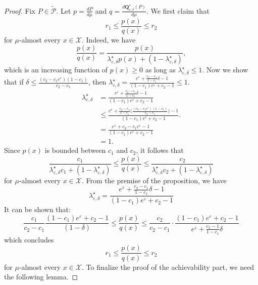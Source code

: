\documentclass[accepted]{article}
\theoremstyle{plain} %
\theoremstyle{definition}
\theoremstyle{remark}
\newcommand{\eps}{\varepsilon}
\newcommand{\bQ}{\mathbf{Q}}
\begin{document}
\begin{proof}
    Fix \( P \in \tilde{\mathcal{P}} \). Let \( p = \frac{dP}{d\mu} \) and \( q = \frac{d\bQ^\star_{\eps,\delta}(P)}{d\mu} \). We first claim that
\[
r_1 \leq \frac{p(x)}{q(x)} \leq r_2
\]
for \(\mu\)-almost every \( x \in \mathcal{X} \). Indeed, we have
\[
\frac{p(x)}{q(x)}
= \frac{p(x)}{\lambda^\star_{\varepsilon,\delta} p(x) + (1 - \lambda^\star_{\varepsilon,\delta})}
,\]
which is an increasing function of \( p(x) \geq 0 \) as long as $\lambda^\star_{\eps,\delta} \leq 1$. Now we show that if $\delta \leq \frac{(c_2-c_1e^\eps)(1-c_1)}{c_2-c_1}$, then $\lambda^\star_{\varepsilon, \delta} 
    = \frac{e^{\varepsilon} + \frac{c_2 - c_1}{1 - c_1} \delta - 1}
           {(1 - c_1) e^{\varepsilon} + c_2 - 1} \leq 1$. 
           \begin{align*}
               \lambda^\star_{\varepsilon, \delta} 
   & = \frac{e^{\varepsilon} + \frac{c_2 - c_1}{1 - c_1} \delta - 1}
           {(1 - c_1) e^{\varepsilon} + c_2 - 1} \\
           &\leq  \frac{e^{\varepsilon} + \frac{c_2 - c_1}{1 - c_1} \Big( \frac{(c_2-c_1e^\eps)(1-c_1)}{c_2-c_1}\Big) - 1}
           {(1 - c_1) e^{\varepsilon} + c_2 - 1}.\\
           & = \frac{e^{\varepsilon} +  c_2-c_1e^\eps - 1}
           {(1 - c_1) e^{\varepsilon} + c_2 - 1} \\
           & = 1.
           \end{align*}
           Since \( p(x) \) is bounded between \( c_1 \) and \( c_2 \), it follows that
\begin{equation}\label{eqn: p/q ratio}
    \frac{c_1}{\lambda^\star_{\varepsilon,\delta} c_1 + (1 - \lambda^\star_{\varepsilon,\delta})}
\leq \frac{p(x)}{q(x)}
\leq \frac{c_2}{\lambda^\star_{\varepsilon,\delta} c_2 + (1 - \lambda^\star_{\varepsilon,\delta})}
\end{equation}
for \(\mu\)-almost every \( x \in \mathcal{X} \).
From the premise of the proposition, we have
\begin{equation*}
    \lambda^\star_{\varepsilon, \delta} 
    = \frac{e^{\varepsilon} + \frac{c_2 - c_1}{1 - c_1} \delta - 1}
           {(1 - c_1) e^{\varepsilon} + c_2 - 1}
\end{equation*}
It can be shown that:
\[
\frac{c_1}{c_2 -c_1}\frac{  (1-c_1) e^{\varepsilon} + c_2 - 1 }{(1-\delta)}
\leq \frac{p(x)}{q(x)}
\leq \frac{c_2}{c_2 - c_1} \cdot \frac{(1 - c_1)e^{\varepsilon} + c_2 - 1}{e^{\varepsilon} + \frac{c_2 - 1}{1 - c_1} \delta}
\]
which concludes
\[
r_1 \leq \frac{p(x)}{q(x)} \leq r_2
\]
for \(\mu\)-almost every \( x \in \mathcal{X} \).
To finalize the proof of the achievability part, we need the following lemma.


\end{proof}
\end{document}
